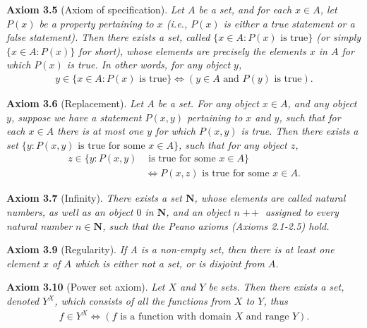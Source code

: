 \documentclass{book}
\DeclareMathOperator{\tadd}{+\!+}%
\newcommand{\titl}[1]{\noindent\textbf{#1}}
\begin{document}
\begin{framed}
\titl{Axiom 3.5} (Axiom of specification). \emph{Let $A$ be a set, and for each $x\in A$, let $P(x)$ be a property pertaining to $x$ (i.e., $P(x)$ is either a true statement or a false statement). Then there exists a set, called $\{x\in A : P(x)\text{ is true}\}$ (or simply $\{x\in A : P(x)\}$ for short), whose elements are precisely the elements $x$ in $A$ for which $P(x)$ is true. In other words, for any object $y$,}
\begin{align*}
   y\in\{x\in A:P(x)\text{ is true}\}\iff(y\in A\text{ and }P(y)\text{ is true}).
\end{align*}
\end{framed}

\begin{framed}
\titl{Axiom 3.6} (Replacement). \emph{Let $A$ be a set. For any object $x\in A$, and any object $y$, suppose we have a statement $P(x,y)$ pertaining to $x$ and $y$, such that for each $x\in A$ there is at most one $y$ for which $P(x,y)$ is true. Then there exists a set $\{y:P(x,y)\text{ is true for some }x\in A\}$, such that for any object $z$,}
\begin{align*}
   z\in\{y:P(x,y)&\text{ is true for some }x\in A\}\\
   &\iff P(x,z)\text{ is true for some }x\in A.
\end{align*}
\end{framed}

\begin{framed}
\titl{Axiom 3.7} (Infinity). \emph{There exists a set $\mathbf{N}$, whose elements are called natural numbers, as well as an object $0$ in $\mathbf{N}$, and an object $n\tadd$ assigned to every natural number $n\in \mathbf{N}$, such that the Peano axioms (Axioms 2.1-2.5) hold.}
\end{framed}

\begin{framed}
\titl{Axiom 3.9} (Regularity). \emph{If A is a non-empty set, then there is at least one element $x$ of $A$ which is either not a set, or is disjoint from $A$.}
\end{framed}

\begin{framed}
\titl{Axiom 3.10} (Power set axiom). \emph{Let $X$ and $Y$ be sets. Then there exists a set, denoted $Y^X$, which consists of all the functions from $X$ to $Y$, thus}
\begin{align*}
   f\in Y^X\iff (f\text{ is a function with domain $X$ and range $Y$}).
\end{align*}
\end{framed}
\end{document}
